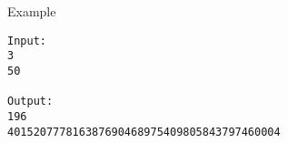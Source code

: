 Example
\begin{verbatim}
Input:
3
50

Output:
196
401520777816387690468975409805843797460004
\end{verbatim}